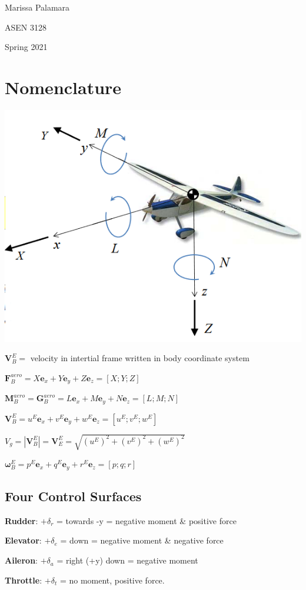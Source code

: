 \documentclass{article}
\begin{document}
\begin{multicols*}{2}
    Marissa Palamara\par 
    ASEN 3128\par 
    Spring 2021
    \vspace{-0.5cm}

\section*{Nomenclature}
\includegraphics[width=0.75\linewidth]{Images/Body_Frame.png}\par
$\mathbf{V}_B^E = $ velocity in intertial frame written in body coordinate system\par 
$\mathbf{F}_B^{aero}= X\mathbf{e}_x+Y\mathbf{e}_y+Z\mathbf{e}_z=[X;Y;Z]$\par 
$\mathbf{M}_B^{aero}=\mathbf{G}_B^{aero}=L\mathbf{e}_x+M\mathbf{e}_y+N\mathbf{e}_z=[L;M;N]$\par 
$\mathbf{V}_B^E=u^E\mathbf{e}_x+v^E\mathbf{e}_y+w^E\mathbf{e}_z=[u^E;v^E;w^E]$\par 
$V_g=|\mathbf{V}_B^E|=\mathbf{V}_E^E=\sqrt{(u^E)^2+(v^E)^2+(w^E)^2}$\par 
$\mathbf{\omega}_B^E=p^E\mathbf{e}_x+q^E\mathbf{e}_y+r^E\mathbf{e}_z=[p;q;r]$\par 
\subsection*{Four Control Surfaces}
\textbf{Rudder}: $+\delta_r$ = towards -y = negative moment \& positive force\par 
\textbf{Elevator}: $+\delta_e$ = down = negative moment \& negative force\par 
\textbf{Aileron}: $+\delta_a$ = right (+y) down = negative moment\par 
\textbf{Throttle}: $+\delta_t$ = no moment, positive force.\par 

\end{multicols*}
\end{document}
